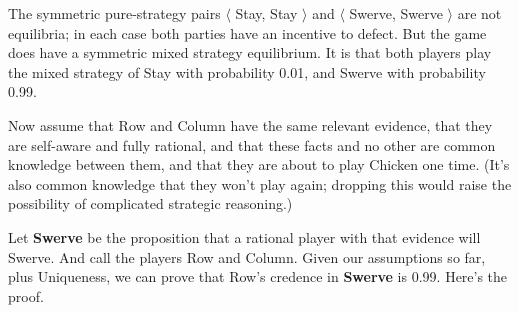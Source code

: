 \documentclass[
  12pt,
  letterpaper,
  DIV=11,
  numbers=noendperiod]{scrreprt}
\begin{document}
The symmetric pure-strategy pairs \(\langle\) Stay, Stay \(\rangle\) and
\(\langle\) Swerve, Swerve \(\rangle\) are not equilibria; in each case
both parties have an incentive to defect. But the game does have a
symmetric mixed strategy equilibrium. It is that both players play the
mixed strategy of Stay with probability 0.01, and Swerve with
probability 0.99.

Now assume that Row and Column have the same relevant evidence, that
they are self-aware and fully rational, and that these facts and no
other are common knowledge between them, and that they are about to play
Chicken one time. (It's also common knowledge that they won't play
again; dropping this would raise the possibility of complicated
strategic reasoning.)

Let \textbf{Swerve} be the proposition that a rational player with that
evidence will Swerve. And call the players Row and Column. Given our
assumptions so far, plus Uniqueness, we can prove that Row's credence in
\textbf{Swerve} is 0.99. Here's the proof.
\end{document}
